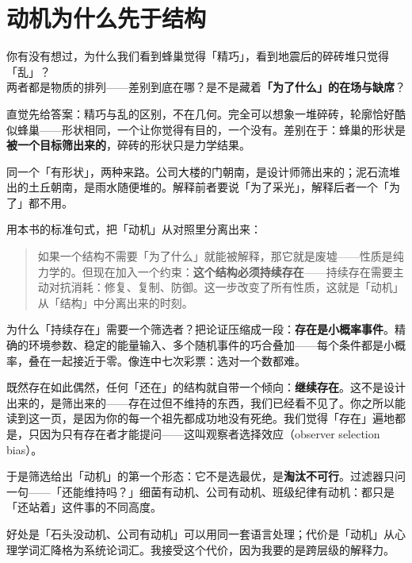 \documentclass[../../main2.tex]{subfiles}
\begin{document}
\section{动机为什么先于结构}

\begin{readingnote}
	你有没有想过，为什么我们看到蜂巢觉得「精巧」，看到地震后的碎砖堆只觉得「乱」？\\
	两者都是物质的排列——差别到底在哪？是不是藏着\textbf{「为了什么」的在场与缺席}？
\end{readingnote}

直觉先给答案：精巧与乱的区别，不在几何。完全可以想象一堆碎砖，轮廓恰好酷似蜂巢——形状相同，一个让你觉得有目的，一个没有。差别在于：蜂巢的形状是\textbf{被一个目标筛出来的}，碎砖的形状只是力学结果。

\begin{tcolorbox}[colback=green!5, title=\textit{生活类比}]
	同一个「有形状」，两种来路。公司大楼的门朝南，是设计师筛出来的；泥石流堆出的土丘朝南，是雨水随便堆的。解释前者要说「为了采光」，解释后者一个「为了」都不用。
\end{tcolorbox}

用本书的标准句式，把「动机」从对照里分离出来：

\begin{quote}
	如果一个结构不需要「为了什么」就能被解释，那它就是废墟——性质是纯力学的。但现在加入一个约束：\textbf{这个结构必须持续存在}——持续存在需要主动对抗消耗：修复、复制、防御。这一步改变了所有性质，这就是「动机」从「结构」中分离出来的时刻。
\end{quote}

为什么「持续存在」需要一个筛选者？把论证压缩成一段：\textbf{存在是小概率事件}。精确的环境参数、稳定的能量输入、多个随机事件的巧合叠加——每个条件都是小概率，叠在一起接近于零。像连中七次彩票：选对一个数都难。

既然存在如此偶然，任何「还在」的结构就自带一个倾向：\textbf{继续存在}。这不是设计出来的，是筛出来的——存在过但不维持的东西，我们已经看不见了。你之所以能读到这一页，是因为你的每一个祖先都成功地没有死绝。我们觉得「存在」遍地都是，只因为只有存在者才能提问——这叫观察者选择效应（observer selection bias）。

于是筛选给出「动机」的第一个形态：它不是选最优，是\textbf{淘汰不可行}。过滤器只问一句——「还能维持吗？」细菌有动机、公司有动机、班级纪律有动机：都只是「还站着」这件事的不同高度。

好处是「石头没动机、公司有动机」可以用同一套语言处理；代价是「动机」从心理学词汇降格为系统论词汇。我接受这个代价，因为我要的是跨层级的解释力。
\end{document}
